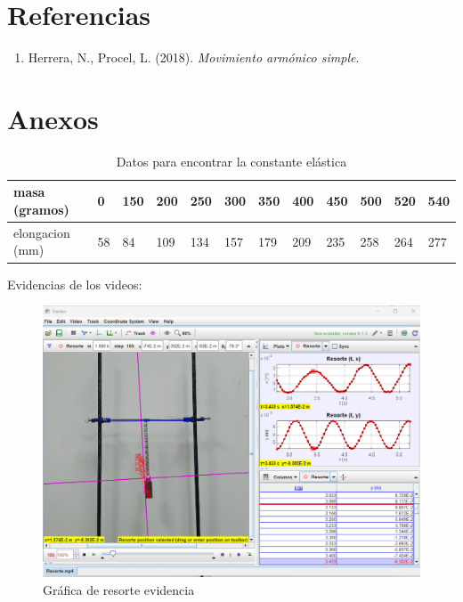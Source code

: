 \documentclass[a4paper]{article}
\begin{document}
\section{Referencias}

\begin{enumerate}
    \item Herrera, N., Procel, L. (2018). \textit{Movimiento armónico simple}.
\end{enumerate}

\section{Anexos}

\begin{table}[H]
    \centering
    \begin{tabular}{|l|l|l|l|l|l|l|l|l|l|l|l|}
    \hline
        masa (gramos) & 0 & 150 & 200 & 250 & 300 & 350 & 400 & 450 & 500 & 520 & 540  \\ \hline
        elongacion (mm) & 58 & 84 & 109 & 134 & 157 & 179 & 209 & 235 & 258 & 264 & 277  \\ \hline
    \end{tabular}
    \caption{Datos para encontrar la constante elástica}
\end{table}

Evidencias de los videos:

\begin{figure} [H] 
    \centering
    \includegraphics[scale=0.5]{Resorte 2.png}
    \caption{Gráfica de resorte evidencia}
    \label{Resorte 2}
\end{figure}
\end{document}
